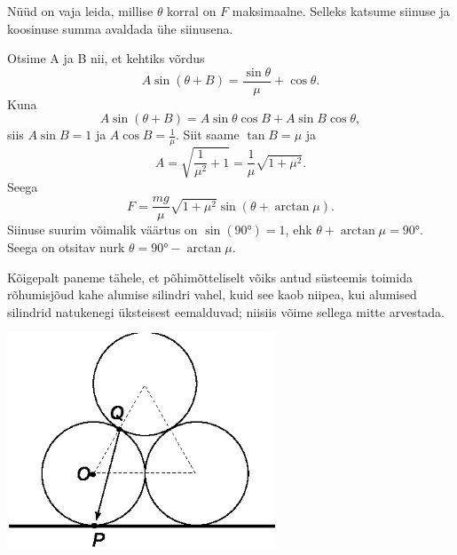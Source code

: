 \documentclass[10pt]{article}
\begin{document}
{Nüüd on vaja leida, millise $\theta$ korral on $F$ maksimaalne. Selleks katsume siinuse ja koosinuse summa avaldada ühe siinusena. 

Otsime A ja B nii, et kehtiks võrdus 
\[
A\sin (\theta+B)=\frac{\sin\theta}{\mu}+\cos\theta.
\]
Kuna 
\[
A\sin (\theta+B)=A\sin\theta\cos B + A\sin B \cos\theta,
\]
siis 
$A\sin B=1$ ja $A\cos B=\frac{1}{\mu}$. Siit saame $\tan B=\mu$ ja 
\[
A=\sqrt{\frac{1}{{\mu}^2} + 1}=\frac{1}{\mu}\sqrt{1+{\mu}^2}.
\]
Seega 
\[
F=\frac{mg}{\mu}\sqrt{1+{\mu}^2}\sin(\theta + \arctan\mu).
\]
Siinuse suurim võimalik väärtus on $\sin(\ang{90})=1$, ehk $\theta + \arctan\mu=\ang{90}$. Seega on otsitav nurk $\theta = \ang{90}-\arctan\mu$.
\probend
\bigskip


\solu
Kõigepalt paneme tähele, et põhimõtteliselt võiks antud süsteemis toimida rõhumisjõud kahe alumise silindri vahel, kuid see
kaob niipea, kui alumised silindrid natukenegi üksteisest eemalduvad; niisiis võime sellega mitte arvestada.

\begin{center}
	\includegraphics[width=0.6\textwidth]{2010-v2g-10-torudlah.eps}
\end{center}

}
\end{document}
